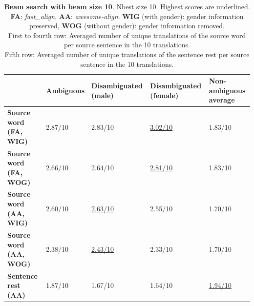 \begin{table}

    \begin{subtable}{\textwidth}
        \centering
        \begin{tabularx}{\linewidth}{|X|XXXX|}
            \hline
             & \textbf{Ambiguous} & \textbf{Disambiguated (male)} & \textbf{Disambiguated (female)} & \textbf{Non-ambiguous average} \\ \hline
             \textbf{Source word (FA, WIG)} & 2.87/10 & 2.83/10 & \underline{3.02/10} & 1.83/10 \\
             \textbf{Source word (FA, WOG)} & 2.66/10 & 2.64/10 & \underline{2.81/10} & 1.83/10 \\
             \textbf{Source word (AA, WIG)} & 2.60/10 & \underline{2.63/10} & 2.55/10 & 1.70/10 \\ 
             \textbf{Source word (AA, WOG)} & 2.38/10 & \underline{2.43/10} & 2.33/10 & 1.70/10 \\\hline 
             \textbf{Sentence rest (AA)} & 1.87/10 & 1.67/10 & 1.64/10 & \underline{1.94/10} \\ \hline
        \end{tabularx}
        \caption{\textbf{Beam search with beam size 10}. Nbest size 10. Highest scores are underlined. \textbf{FA}: \textit{fast\_align}, \textbf{AA}: \textit{awesome-align}. \textbf{WIG} (with gender): gender information preserved, \textbf{WOG} (without gender): gender information removed. \\ First to fourth row: Averaged number of unique translations of the source word per source sentence in the 10 translations. \\ Fifth row: Averaged number of unique translations of the sentence rest per source sentence in the 10 translations.}
        \label{tab:alignment_translation_10}
    \end{subtable}


\end{table}
